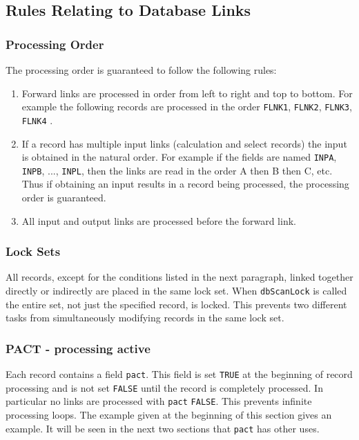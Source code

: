 \subsection{Rules Relating to Database Links}

\subsubsection{Processing Order}

The processing order is guaranteed to follow the following rules:

\begin{enumerate}\item Forward links are processed in order from left to right and top to bottom. For example the following records are 
processed in the order \verb|FLNK1|, \verb|FLNK2|, \verb|FLNK3|, \verb|FLNK4| .

\item If a record has multiple input links (calculation and select records) the input is obtained in the natural order. For 
example if the fields are named \verb|INPA|, \verb|INPB|, ..., \verb|INPL|, then the links are read in the order A then B then C, etc. 
Thus if obtaining an input results in a record being processed, the processing order is guaranteed.

\item All input and output links are processed before the forward link.

\end{enumerate}\subsubsection{Lock Sets}

All records, except for the conditions listed in the next paragraph, linked together directly or indirectly are placed in the 
same lock set. When \verb|dbScanLock| is called the entire set, not just the specified record, is locked. This prevents two 
different tasks from simultaneously modifying records in the same lock set.

\subsubsection{PACT - processing active}

Each record contains a field \verb|pact|. This field is set \verb|TRUE| at the beginning of record processing and is not set \verb|FALSE| until 
the record is completely processed. In particular no links are processed with \verb|pact| \verb|FALSE|. This prevents infinite 
processing loops. The example given at the beginning of this section gives an example. It will be seen in the next two 
sections that \verb|pact| has other uses.

